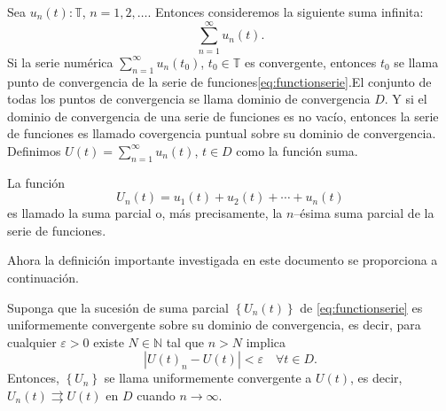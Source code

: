 Sea $u_{n}\left(t\right)\colon\mathds{T}$, $n=1,2,\ldots$. Entonces consideremos la siguiente suma infinita:
\begin{equation}\label{eq:functionserie}
\sum_{n=1}^{\infty}u_{n}\left(t\right).
\end{equation}
Si la serie numérica $\sum_{n=1}^{\infty}u_{n}\left(t_{0}\right)$, $t_{0}\in\mathds{T}$ es convergente, entonces $t_{0}$ se llama punto de convergencia de la serie de funciones\eqref{eq:functionserie}.El conjunto de todas los puntos de convergencia se llama dominio de convergencia $D$. Y si el dominio de convergencia de una serie de funciones es no vacío, entonces la serie de funciones es llamado covergencia puntual sobre su dominio de convergencia. Definimos $U\left(t\right)=\sum_{n=1}^{\infty}u_{n}\left(t\right)$, $t\in D$ como la función suma.
\begin{definition}
	La función \[ U_{n}\left(t\right)=u_{1}\left(t\right)+u_{2}\left(t\right)+\cdots+u_{n}\left(t\right) \] es llamado la suma parcial o, más precisamente, la $n$--ésima suma parcial de la serie de funciones.
\end{definition}
Ahora la definición importante investigada en este documento se proporciona a continuación.
\begin{definition}
	Suponga que la sucesión de suma parcial $\left\{U_{n}\left(t\right)\right\}$ de \eqref{eq:functionserie} es uniformemente convergente sobre su dominio de convergencia, es decir, para cualquier $\varepsilon>0$ existe $N\in\mathds{N}$ tal que $n>N$ implica \[ \left|{U\left(t\right)}_{n}-U\left(t\right)\right|<\varepsilon\quad\forall t\in D. \] Entonces, $\left\{U_{n}\right\}$ se llama uniformemente convergente a $U\left(t\right)$, es decir, $U_{n}\left(t\right)\rightrightarrows U\left(t\right)$ en $D$ cuando $n\to\infty$.
\end{definition}